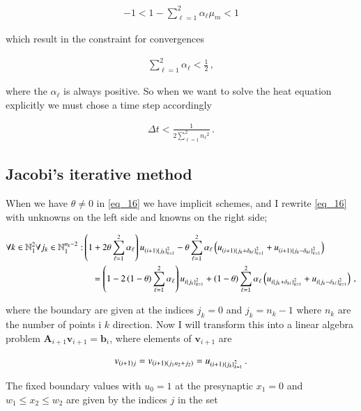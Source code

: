 \documentclass[11pt,english,a4paper]{article}
\begin{document}
\begin{flushleft}
\begin{align*}
-1 < 1 - \sum_{\ell=1}^2 \alpha_\ell \mu_m < 1
\end{align*}

which result in the constraint for convergences

\begin{align*}
\sum_{\ell = 1}^2 \alpha_\ell < \frac{1}{2} \,,
\end{align*}

where the $\alpha_\ell$ is always positive. So when we want to solve the heat equation explicitly we must chose a time step accordingly

\begin{align}
\Delta t < \frac{1}{2\sum_{\ell=1}^2 {n_\ell}^2} \,.
\label{eq_20}
\end{align}

\subsection{Jacobi's iterative method}

When we have $\theta\neq 0$ in \eqref{eq_16} we have implicit schemes, and I rewrite \eqref{eq_16} with unknowns on the left side and knowns on the right side;

\begin{align*}
\forall k\in\mathbb{N}_1^2 \forall j_k \in \mathbb{N}_1^{n_k-2} : &\left({1+2\theta\sum_{\ell=1}^2 \alpha_\ell}\right) u_{(i+1)\left\lbrace{j_k}\right\rbrace_{k=1}^2} - \theta\sum_{\ell = 1}^2\alpha_\ell \left({u_{(i+1)\left\lbrace{j_k+\delta_{k\ell}}\right\rbrace_{k=1}^2} + u_{(i+1)\left\lbrace{j_k-\delta_{k\ell}}\right\rbrace_{k=1}^2}}\right) 
\\
&\quad = \left({1-2\left({1-\theta}\right)\sum_{\ell = 1}^2 \alpha_\ell}\right) u_{i\left\lbrace{j_k}\right\rbrace_{k=1}^2} + \left({1-\theta}\right)\sum_{\ell=1}^2\alpha_\ell\left({u_{i\left\lbrace{j_k+\delta_{k\ell}}\right\rbrace_{k=1}^2} + u_{i\left\lbrace{j_k-\delta_{k\ell}}\right\rbrace_{k=1}^2}}\right) \,,
\end{align*}

where the boundary are given at the indices $j_k=0$ and $j_k= n_k-1$ where $n_k$ are the number of points i $k$ direction. Now I will transform this into a linear algebra problem $\textbf{A}_{i+1}\textbf{v}_{i+1} = \textbf{b}_i$, where elements of $\textbf{v}_{i+1}$ are

\begin{align}
v_{(i+1)j} = v_{(i+1)(j_1 n_2 + j_2)} = u_{(i+1)\left\lbrace{j_k}\right\rbrace_{k=1}^2} \,.
\label{eq_21}
\end{align}

The fixed boundary values with $u_0=1$ at the presynaptic $x_1=0$ and $w_1 \leq x_2 \leq w_2$ are given by the indices $j$ in the set


\end{flushleft}
\end{document}
